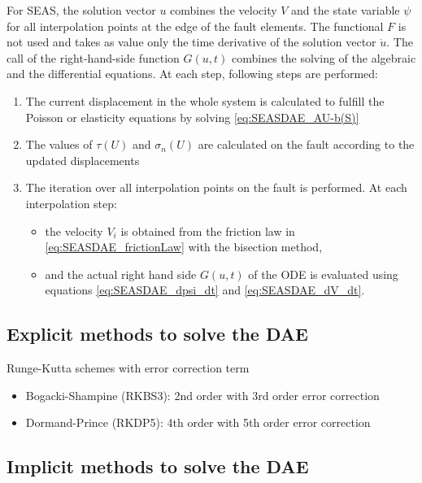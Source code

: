 \documentclass{report}
\begin{document}
For SEAS, the solution vector $u$ combines the velocity $V$ and the state variable $\psi$ for all interpolation points at the edge of the fault elements. The functional $F$ is not used and takes as value only the time derivative of the solution vector $\dot{u}$. The call of the right-hand-side function $G(u,t)$ combines the solving of the algebraic and the differential equations. At each step, following steps are performed: 
\begin{enumerate}
    \item The current displacement in the whole system is calculated to fulfill the Poisson or elasticity equations by solving \autoref{eq:SEASDAE_AU-b(S)} \\
    \item The values of $\tau(U)$ and $\sigma_n(U)$ are calculated on the fault according to the updated displacements \\
    \item The iteration over all interpolation points on the fault is performed. At each interpolation step: \begin{itemize}
        \item the velocity $V_i$ is obtained from the friction law in \autoref{eq:SEASDAE_frictionLaw} with the bisection method,
        \item and the actual right hand side $G(u,t)$ of the ODE is evaluated using equations \ref{eq:SEASDAE_dpsi_dt} and \ref{eq:SEASDAE_dV_dt}.
    \end{itemize}
\end{enumerate}


\subsection{Explicit methods to solve the DAE}
Runge-Kutta schemes with error correction term 
\begin{itemize}
    \item Bogacki-Shampine (RKBS3): 2nd order with 3rd order error correction \\
    \item Dormand-Prince (RKDP5): 4th order with 5th order error correction 
\end{itemize}

\subsection{Implicit methods to solve the DAE}
\end{document}
